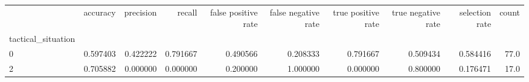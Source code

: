 \begin{tabular}{lrrrrrrrrr}
\toprule
{} &  accuracy &  precision &    recall &  false positive rate &  false negative rate &  true positive rate &  true negative rate &  selection rate &  count \\
tactical\_situation &           &            &           &                      &                      &                     &                     &                 &        \\
\midrule
0                  &  0.597403 &   0.422222 &  0.791667 &             0.490566 &             0.208333 &            0.791667 &            0.509434 &        0.584416 &   77.0 \\
2                  &  0.705882 &   0.000000 &  0.000000 &             0.200000 &             1.000000 &            0.000000 &            0.800000 &        0.176471 &   17.0 \\
\bottomrule
\end{tabular}
